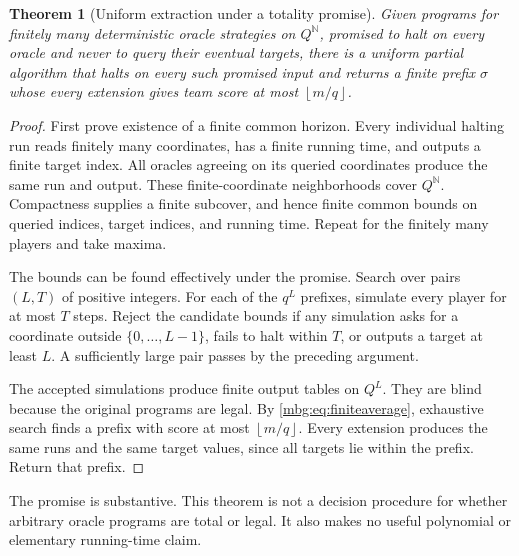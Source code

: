 \documentclass[11pt,letterpaper]{article}
\newtheorem{theorem}{Theorem}[section]
\theoremstyle{definition}
\newcommand{\N}{\mathbb N}
\newcommand{\floor}[1]{\left\lfloor #1\right\rfloor}
\begin{document}
\begin{theorem}[Uniform extraction under a totality promise]
\label{mbg:thm:extract}
Given programs for finitely many deterministic oracle strategies on $Q^\N$, promised to halt on every oracle and never to query their eventual targets, there is a uniform partial algorithm that halts on every such promised input and returns a finite prefix $\sigma$ whose every extension gives team score at most $\floor{m/q}$.
\end{theorem}
\begin{proof}
First prove existence of a finite common horizon. Every individual halting run reads finitely many coordinates, has a finite running time, and outputs a finite target index. All oracles agreeing on its queried coordinates produce the same run and output. These finite-coordinate neighborhoods cover $Q^\N$. Compactness supplies a finite subcover, and hence finite common bounds on queried indices, target indices, and running time. Repeat for the finitely many players and take maxima.

The bounds can be found effectively under the promise. Search over pairs $(L,T)$ of positive integers. For each of the $q^L$ prefixes, simulate every player for at most $T$ steps. Reject the candidate bounds if any simulation asks for a coordinate outside $\{0,\ldots,L-1\}$, fails to halt within $T$, or outputs a target at least $L$. A sufficiently large pair passes by the preceding argument.

The accepted simulations produce finite output tables on $Q^L$. They are blind because the original programs are legal. By \eqref{mbg:eq:finiteaverage}, exhaustive search finds a prefix with score at most $\floor{m/q}$. Every extension produces the same runs and the same target values, since all targets lie within the prefix. Return that prefix.
\end{proof}

The promise is substantive. This theorem is not a decision procedure for whether arbitrary oracle programs are total or legal. It also makes no useful polynomial or elementary running-time claim.
\end{document}
